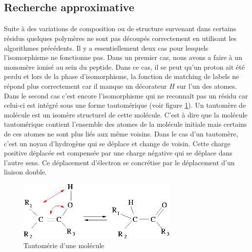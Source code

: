 \documentclass[12pt,french,twoside]{report}
\begin{document}
\subsection{Recherche approximative}

\label{light_p}

\paragraph{}Suite à des variations de composition ou de structure survenant dans certains résidus quelques polymères ne sont pas
découpés correctement en utilisant les algorithmes précédents. Il y a essentiellement deux cas pour lesquels l'isomorphisme
ne fonctionne pas. Dans un premier cas, nous avons a faire à un monomère ionisé au sein du peptide. Dans ce cas, il se peut qu'un
proton ait été perdu et lors de la phase d'isomorphisme, la fonction de matching de labels ne répond plus correctement car il
manque un décorateur $H$ sur l'un des atomes. Dans le second cas c'est encore l'isomorphisme qui ne reconnaît pas un résidu car
celui-ci est intégré sous une forme tautomérique (voir figure \ref{tautomer}).
Un tautomère de molécule est un isomère structurel de cette molécule.
C'est à dire que la molécule tautomérique contient l'ensemble des atomes de la molécule initiale  mais certains
de ces atomes ne sont plus liés aux même voisins. Dans le cas d'un tautomère, c'est un noyau d'hydrogène qui se déplace et change
de voisin. Cette charge positive déplacée est compensée par une charge négative qui se déplace dans l'autre sens. Ce déplacement
d'électron se concrétise par le déplacement d'un liaison double.

\begin{figure}
  \includegraphics[width=300px]{Figures/s2m/residues/tautomers.png}
  \caption{\label{tautomer}Tautomérie d'une molécule}
\end{figure}
\end{document}

